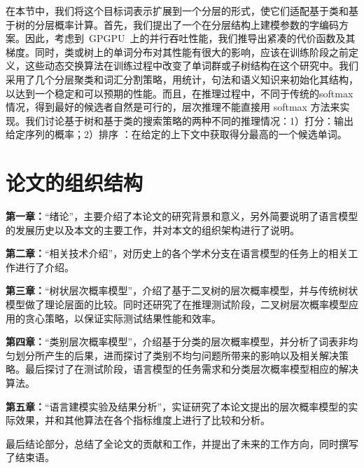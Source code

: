 在本节中，我们将这个目标词表示扩展到一个分层的形式，使它们适配基于类和基于树的分层概率计算。首先，我们提出了一个在分层结构上建模参数的字编码方案。因此，考虑到~GPGPU~上的并行吞吐性能，我们推导出紧凑的代价函数及其梯度。同时，类或树上的单词分布对其性能有很大的影响，应该在训练阶段之前定义，这些动态交换算法在训练过程中改变了单词群或子树结构在这个研究中。我们采用了几个分层聚类和词汇分割策略，用统计，句法和语义知识来初始化其结构，以达到一个稳定和可以预期的性能。而且，在推理过程中，不同于传统的softmax情况，得到最好的候选者自然是可行的，层次推理不能直接用 softmax 方法来实现。我们讨论基于树和基于类的搜索策略的两种不同的推理情况：1）打分：输出给定序列的概率；2）排序   ：在给定的上下文中获取得分最高的一个候选单词。
\section{论文的组织结构}
\textbf{第一章：}``绪论''，主要介绍了本论文的研究背景和意义，另外简要说明了语言模型的发展历史以及本文的主要工作，并对本文的组织架构进行了说明。

\textbf{第二章：}``相关技术介绍''，对历史上的各个学术分支在语言模型的任务上的相关工作进行了介绍。

\textbf{第三章：}``树状层次概率模型''，介绍了基于二叉树的层次概率模型，并与传统树状模型做了理论层面的比较。同时还研究了在推理测试阶段，二叉树层次概率模型应用的贪心策略，以保证实际测试结果性能和效率。

\textbf{第四章：}``类别层次概率模型''，介绍基于分类的层次概率模型，并分析了词表非均匀划分所产生的后果，进而探讨了类别不均匀问题所带来的影响以及相关解决策略。最后探讨了在测试阶段，语言模型的任务需求和分类层次概率模型相应的解决算法。

\textbf{第五章：}``语言建模实验及结果分析''，实证研究了本论文提出的层次概率模型的实际效果，并和其他算法在各个指标维度上进行了比较和分析。

最后结论部分，总结了全论文的贡献和工作，并提出了未来的工作方向，同时撰写了结束语。



